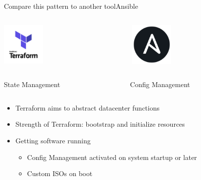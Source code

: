 \documentclass{beamer}
\begin{document}
\begin{frame}{Compare this pattern to another tool}{Ansible}

\begin{columns}
    \centering
    \begin{column}{.5\textwidth}
        \includegraphics[width=80px,keepaspectratio]{./assets/terraform.png}
    \end{column}
    \begin{column}{.5\textwidth}
        \includegraphics[width=80px,keepaspectratio]{./assets/ansible.png}
    \end{column}
\end{columns}

\vspace{0.2cm}

\begin{columns}
    \centering
    \begin{column}{.5\textwidth}
        State Management
    \end{column}
    \begin{column}{.5\textwidth}
        Config Management
    \end{column}
\end{columns}

\vspace{0.2cm}

\begin{itemize}
    \item Terraform aims to abstract datacenter functions
    \item Strength of Terraform: bootstrap and initialize resources
    \item Getting software running
    \begin{itemize}
        \item Config Management activated on system startup or later
        \item Custom ISOs on boot
    \end{itemize}
\end{itemize}

\end{frame}
\end{document}
